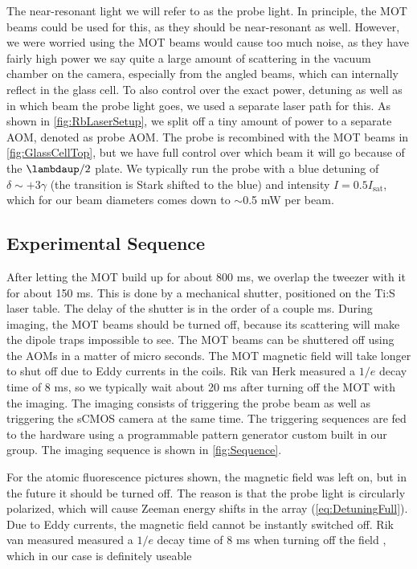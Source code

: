 The near-resonant light we will refer to as the probe light. 
In principle, the MOT beams could be used for this, as they should be near-resonant as well. 
However, we were worried using the MOT beams would cause too much noise, as they have fairly high power we say quite a large amount of scattering in the vacuum chamber on the camera, especially from the angled beams, which can internally reflect in the glass cell.
To also control over the exact power, detuning as well as in which beam the probe light goes, we used a separate laser path for this. 
As shown in \cref{fig:RbLaserSetup}, we split off a tiny amount of power to a separate AOM, denoted as probe AOM. 
The probe is recombined with the MOT beams in \cref{fig:GlassCellTop}, but we have full control over which beam it will go because of the $\lambdaup/2$ plate.
We typically run the probe with a blue detuning of $\delta \sim +3\gamma$ (the transition is Stark shifted to the blue) and intensity $I = 0.5 I_{\text{sat}}$, which for our beam diameters comes down to $\sim0.$5 mW per beam. 

\subsection{Experimental Sequence}

After letting the MOT build up for about 800 ms, we overlap the tweezer with it for about 150 ms.
This is done by a mechanical shutter, positioned on the \ac{Ti:S} laser table.
The delay of the shutter is in the order of a couple ms. 
During imaging, the MOT beams should be turned off, because its scattering will make the dipole traps impossible to see. 
The MOT beams can be shuttered off using the \ac{AOM}s in a matter of micro seconds. 
The MOT magnetic field will take longer to shut off due to Eddy currents in the coils. 
Rik van Herk measured a $1/e$ decay time of 8 ms, so we typically wait about 20 ms after turning off the MOT with the imaging. 
The imaging consists of triggering the probe beam as well as triggering the sCMOS camera at the same time. 
The triggering sequences are fed to the hardware using a programmable pattern generator custom built in our group. 
The imaging sequence is shown in \cref{fig:Sequence}.

For the atomic fluorescence pictures shown, the magnetic field was left on, but in the future it should be turned off. 
The reason is that the probe light is circularly polarized, which will cause Zeeman energy shifts in the array (\cref{eq:DetuningFull}).  
Due to Eddy currents, the magnetic field cannot be instantly switched off. 
Rik van measured measured a $1/e$ decay time of 8 ms when turning off the field \cite{Herk2022}, which in our case is definitely useable 

